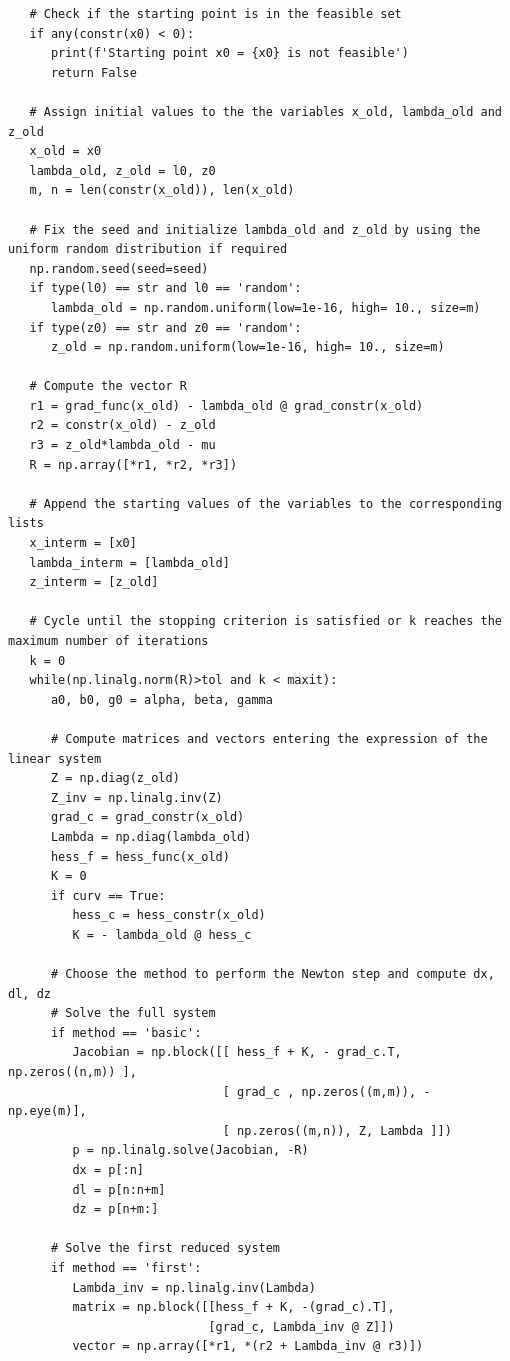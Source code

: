 \documentclass[a4paper,11pt]{article}
\begin{document}
\begin{verbatim}
   # Check if the starting point is in the feasible set
   if any(constr(x0) < 0):
      print(f'Starting point x0 = {x0} is not feasible')
      return False

   # Assign initial values to the the variables x_old, lambda_old and z_old
   x_old = x0
   lambda_old, z_old = l0, z0
   m, n = len(constr(x_old)), len(x_old)

   # Fix the seed and initialize lambda_old and z_old by using the uniform random distribution if required 
   np.random.seed(seed=seed)
   if type(l0) == str and l0 == 'random':
      lambda_old = np.random.uniform(low=1e-16, high= 10., size=m)
   if type(z0) == str and z0 == 'random':
      z_old = np.random.uniform(low=1e-16, high= 10., size=m)

   # Compute the vector R
   r1 = grad_func(x_old) - lambda_old @ grad_constr(x_old)
   r2 = constr(x_old) - z_old
   r3 = z_old*lambda_old - mu
   R = np.array([*r1, *r2, *r3])

   # Append the starting values of the variables to the corresponding lists
   x_interm = [x0]
   lambda_interm = [lambda_old]
   z_interm = [z_old]

   # Cycle until the stopping criterion is satisfied or k reaches the maximum number of iterations
   k = 0
   while(np.linalg.norm(R)>tol and k < maxit):
      a0, b0, g0 = alpha, beta, gamma

      # Compute matrices and vectors entering the expression of the linear system
      Z = np.diag(z_old)
      Z_inv = np.linalg.inv(Z)
      grad_c = grad_constr(x_old)
      Lambda = np.diag(lambda_old)
      hess_f = hess_func(x_old)
      K = 0
      if curv == True:
         hess_c = hess_constr(x_old)
         K = - lambda_old @ hess_c

      # Choose the method to perform the Newton step and compute dx, dl, dz
      # Solve the full system
      if method == 'basic':            
         Jacobian = np.block([[ hess_f + K, - grad_c.T, np.zeros((n,m)) ],
                              [ grad_c , np.zeros((m,m)), - np.eye(m)],
                              [ np.zeros((m,n)), Z, Lambda ]])
         p = np.linalg.solve(Jacobian, -R)
         dx = p[:n]
         dl = p[n:n+m]
         dz = p[n+m:]

      # Solve the first reduced system
      if method == 'first':
         Lambda_inv = np.linalg.inv(Lambda)
         matrix = np.block([[hess_f + K, -(grad_c).T],
                            [grad_c, Lambda_inv @ Z]])
         vector = np.array([*r1, *(r2 + Lambda_inv @ r3)])


\end{verbatim}
\end{document}
